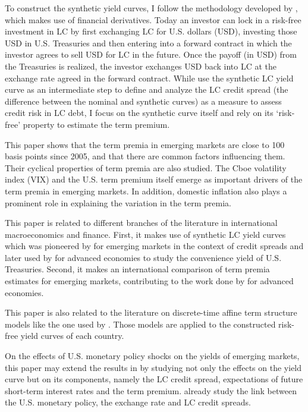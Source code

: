 To construct the synthetic yield curves, I follow the methodology developed by \cite{DuSchreger:2016a}, which makes use of financial derivatives. Today an investor can lock in a risk-free investment in LC by first exchanging LC for U.S. dollars (USD), investing those USD in U.S. Treasuries and then entering into a forward contract in which the investor agrees to sell USD for LC in the future. Once the payoff (in USD) from the Treasuries is realized, the investor exchanges USD back into LC at the exchange rate agreed in the forward contract. While \cite{DuSchreger:2016a} use the synthetic LC yield curve as an intermediate step to define and analyze the LC credit spread (the difference between the nominal and synthetic curves) as a measure to assess credit risk in LC debt, I focus on the synthetic curve itself and rely on its `risk-free' property to estimate the term premium.

This paper shows that the term premia in emerging markets are close to 100 basis points since 2005, and that there are common factors influencing them. Their cyclical properties of term premia are also studied. The Cboe volatility index (VIX) and the U.S. term premium itself emerge as important drivers of the term premia in emerging markets. In addition, domestic inflation also plays a prominent role in explaining the variation in the term premia.

This paper is related to different branches of the literature in international macroeconomics and finance. First, it makes use of synthetic LC yield curves which was pioneered by \cite{DuSchreger:2016a} for emerging markets in the context of credit spreads and later used by \citet*{DuImSchreger:2018} for advanced economies to study the convenience yield of U.S. Treasuries. Second, it makes an international comparison of term premia estimates for emerging markets, contributing to the work done by \cite{Wright:2011} for advanced economies.

This paper is also related to the literature on discrete-time affine term structure models like the one used by \cite{CochranePiazzesi:2008}. Those models are applied to the constructed risk-free yield curves of each country. 

On the effects of U.S. monetary policy shocks on the yields of emerging markets, this paper may extend the results in \citet*{GilchristYueZakrajsek:2018} by studying not only the effects on the yield curve but on its components, namely the LC credit spread, expectations of future short-term interest rates and the term premium. \citet*{HofmannShimShin:2017} already study the link between the U.S. monetary policy, the exchange rate and LC credit spreads.

